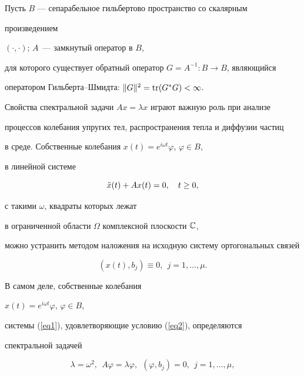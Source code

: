 \maketitle


\label{begin}








Пусть $B$ --- сепарабельное гильбертово пространство со скалярным 


произведением 


$(\cdot,\cdot)$; $A$~--- замкнутый оператор в $B$, 


для которого существует обратный оператор $G=A^{-1}:B\to B$, являющийся


оператором Гильберта--Шмидта: $\|G\|^2=\operatorname{tr} (G^*G)<\infty$.





Свойства спектральной задачи $Ax=\lambda x$ играют важную роль при анализе 


процессов колебания упругих тел, распространения тепла и диффузии частиц 


в среде. Собственные колебания $x(t)=e^{i\omega t}\varphi$, $\varphi\in B$, 


в линейной системе


\begin{equation}\label{eq1}


\Ddot x(t) + Ax(t) = 0,\quad t\ge 0,  


\end{equation}


с такими $\omega$, квадраты которых лежат


в ограниченной области $\Omega$ комплексной плоскости $\Bbb C$,


можно устранить методом наложения на исходную систему ортогональных связей


\begin{equation}\label{eq2}


(x(t),b_j)\equiv 0,\ \ j=1,\dotsc,\mu.


\end{equation}


В самом деле, собственные колебания


$x(t)=e^{i\omega t}\varphi$, $\varphi\in B$,


системы (\ref{eq1}), удовлетворяющие условию (\ref{eq2}), определяются 


спектральной задачей


\begin{equation}\label{eq3}


\lambda=\omega^2,\ \ A\varphi=\lambda\varphi,


\ \ (\varphi,b_j)=0,\ \ j=1,\dotsc,\mu,


\end{equation}


